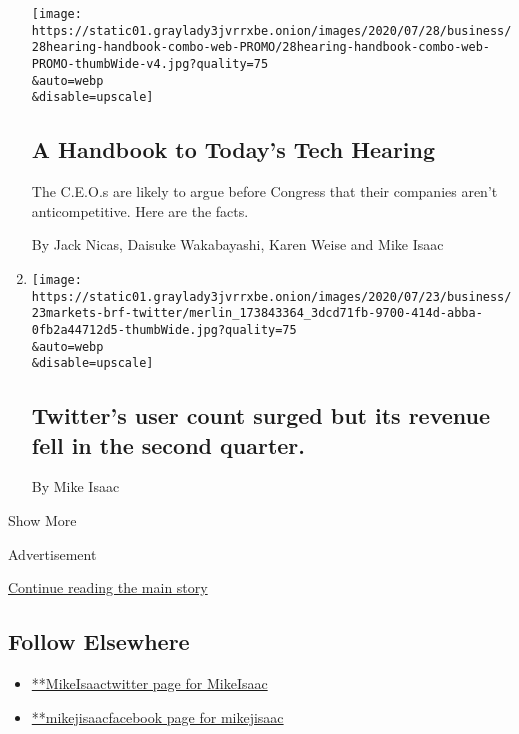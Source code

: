 \begin{enumerate}
  \texttt{[image: https://static01.graylady3jvrrxbe.onion/images/2020/07/28/business/28hearing-handbook-combo-web-PROMO/28hearing-handbook-combo-web-PROMO-thumbWide-v4.jpg?quality=75\\\&auto=webp\\\&disable=upscale]}

  \hypertarget{a-handbook-to-todays-tech-hearing}{%
  \subsection{A Handbook to Today's Tech
  Hearing}\label{a-handbook-to-todays-tech-hearing}}

  The C.E.O.s are likely to argue before Congress that their companies
  aren't anticompetitive. Here are the facts.

  By Jack Nicas, Daisuke Wakabayashi, Karen Weise and Mike Isaac
\item
  \href{/2020/07/23/business/twitter-earnings.html}{}

  \texttt{[image: https://static01.graylady3jvrrxbe.onion/images/2020/07/23/business/23markets-brf-twitter/merlin\_173843364\_3dcd71fb-9700-414d-abba-0fb2a44712d5-thumbWide.jpg?quality=75\\\&auto=webp\\\&disable=upscale]}

  \hypertarget{twitters-user-count-surged-but-its-revenue-fell-in-the-second-quarter}{%
  \subsection{Twitter's user count surged but its revenue fell in the
  second
  quarter.}\label{twitters-user-count-surged-but-its-revenue-fell-in-the-second-quarter}}

  By Mike Isaac
\end{enumerate}

Show More

Advertisement

\protect\hyperlink{after-mid2}{Continue reading the main story}

\hypertarget{follow-elsewhere}{%
\subsection{Follow Elsewhere}\label{follow-elsewhere}}

\begin{itemize}
\tightlist
\item
  \href{https://twitter.com/MikeIsaac}{**MikeIsaactwitter page for
  MikeIsaac}
\item
  \href{https://www.facebookcorewwwi.onion/mikejisaac}{**mikejisaacfacebook
  page for mikejisaac}
\end{itemize}

